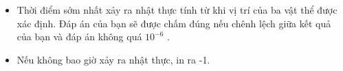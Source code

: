 \begin{itemize}
	\item     Thời điểm sớm nhất xảy ra nhật thực tính từ khi vị trí của ba vật thể được xác định. Đáp án của bạn sẽ được chấm đúng nếu chênh lệch giữa kết quả của bạn và đáp án không quá $10^{-6}$    .   
	\item     Nếu không bao giờ xảy ra nhật thực, in ra -1.   
\end{itemize}